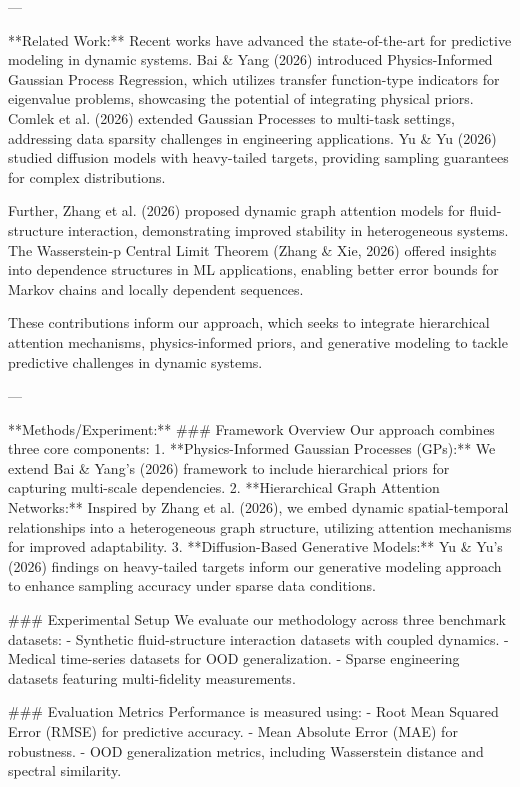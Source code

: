 ---

**Related Work:**  
Recent works have advanced the state-of-the-art for predictive modeling in dynamic systems. Bai & Yang (2026) introduced Physics-Informed Gaussian Process Regression, which utilizes transfer function-type indicators for eigenvalue problems, showcasing the potential of integrating physical priors. Comlek et al. (2026) extended Gaussian Processes to multi-task settings, addressing data sparsity challenges in engineering applications. Yu & Yu (2026) studied diffusion models with heavy-tailed targets, providing sampling guarantees for complex distributions.

Further, Zhang et al. (2026) proposed dynamic graph attention models for fluid-structure interaction, demonstrating improved stability in heterogeneous systems. The Wasserstein-p Central Limit Theorem (Zhang & Xie, 2026) offered insights into dependence structures in ML applications, enabling better error bounds for Markov chains and locally dependent sequences.

These contributions inform our approach, which seeks to integrate hierarchical attention mechanisms, physics-informed priors, and generative modeling to tackle predictive challenges in dynamic systems.

---

**Methods/Experiment:**  
### Framework Overview  
Our approach combines three core components:  
1. **Physics-Informed Gaussian Processes (GPs):** We extend Bai & Yang's (2026) framework to include hierarchical priors for capturing multi-scale dependencies.  
2. **Hierarchical Graph Attention Networks:** Inspired by Zhang et al. (2026), we embed dynamic spatial-temporal relationships into a heterogeneous graph structure, utilizing attention mechanisms for improved adaptability.  
3. **Diffusion-Based Generative Models:** Yu & Yu’s (2026) findings on heavy-tailed targets inform our generative modeling approach to enhance sampling accuracy under sparse data conditions.  

### Experimental Setup  
We evaluate our methodology across three benchmark datasets:  
- Synthetic fluid-structure interaction datasets with coupled dynamics.  
- Medical time-series datasets for OOD generalization.  
- Sparse engineering datasets featuring multi-fidelity measurements.  

### Evaluation Metrics  
Performance is measured using:  
- Root Mean Squared Error (RMSE) for predictive accuracy.  
- Mean Absolute Error (MAE) for robustness.  
- OOD generalization metrics, including Wasserstein distance and spectral similarity.  

